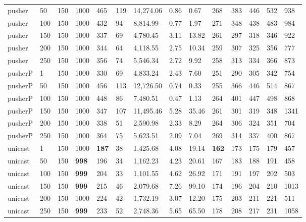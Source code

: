\begin{table}[!htb]
\begin{tabular}{llllllllllllll}
pusher     & 50           & 150   & 1000 & 465   & 119  & 14,274.06     & 0.86     & 0.67     & 268  & 383  & 446   & 532   & 938   \\
pusher     & 100          & 150   & 1000 & 432   & 94   & 8,814.99      & 0.77     & 1.97     & 271  & 348  & 438   & 483   & 984   \\
pusher     & 150          & 150   & 1000 & 337   & 69   & 4,780.45      & 3.11     & 13.82    & 261  & 297  & 318   & 346   & 922   \\
pusher     & 200          & 150   & 1000 & 344   & 64   & 4,118.55      & 2.75     & 10.34    & 259  & 307  & 325   & 356   & 777   \\
pusher     & 250          & 150   & 1000 & 356   & 74   & 5,546.34      & 2.72     & 9.92     & 258  & 313  & 334   & 366   & 873   \\ \hline
pusherP & 1            & 150   & 1000 & 330   & 69   & 4,833.24      & 2.43     & 7.60     & 251  & 290  & 305   & 342   & 754   \\
pusherP & 50           & 150   & 1000 & 456   & 113  & 12,726.50     & 0.74     & 0.33     & 255  & 366  & 446   & 514   & 867   \\
pusherP & 100          & 150   & 1000 & 448   & 86   & 7,480.51      & 0.47     & 1.13     & 264  & 401  & 447   & 498   & 868   \\
pusherP & 150          & 150   & 1000 & 347   & 107  & 11,495.46     & 5.28     & 35.46    & 261  & 301  & 319   & 348   & 1341  \\
pusherP & 200          & 150   & 1000 & 338   & 51   & 2,590.98      & 2.33     & 8.29     & 264  & 306  & 324   & 351   & 704   \\
pusherP & 250          & 150   & 1000 & 364   & 75   & 5,623.51      & 2.09     & 7.04     & 269  & 314  & 337   & 400   & 867   \\ \hline
unicast & 1            & 150   & 1000 & \textbf{187}   & 38   & 1,425.68      & 4.08     & 19.14    & \textbf{162}  & 173  & 175   & 179   & 457   \\
unicast & 50           & 150   & \textbf{998}  & 196   & 34   & 1,162.23      & 4.23     & 20.61    & 167  & 183  & 188   & 191   & 458   \\
unicast & 100          & 150   & \textbf{999}  & 204   & 33   & 1,101.55      & 4.62     & 26.92    & 171  & 191  & 197   & 202   & 503   \\
unicast & 150          & 150   & \textbf{999}  & 215   & 46   & 2,079.68      & 7.26     & 99.10    & 174  & 196  & 204   & 210   & 1013  \\
unicast & 200          & 150   & 1000 & 224   & 42   & 1,732.19      & 3.07     & 12.20    & 175  & 203  & 211   & 221   & 511   \\
unicast & 250          & 150   & \textbf{999}  & 233   & 52   & 2,748.36      & 5.65     & 65.50    & 178  & 208  & 217   & 231   & 1058 \\ \bottomrule
\end{tabular}
\end{table} 



